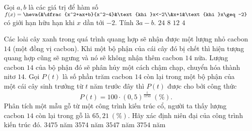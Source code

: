 \begin{ex}%
Gọi $a,b$ là các giá trị để hàm số $f(x)=\heva{&\dfrac{x^2+ax+b}{x^2-4}&\text{khi }x<-2\\&x+1&\text{khi }x\geq -2}$ có giới hạn hữu hạn khi $x$ dần tới $-2$. Tính $3a-b$.
\choice
{$24$}
{$8$}
{\True $12$}
{$4$}
\end{ex}

\begin{ex}%
Các loài cây xanh trong quá trình quang hợp sẽ nhận được một lượng nhỏ cacbon $14$ (một đồng vị cacbon). Khi một bộ phận của cái cây đó bị chết thì hiện tượng quang hợp cũng sẽ ngưng và nó sẽ không nhận thêm cacbon $14$ nữa. Lượng cacbon $14$ của bộ phận đó sẽ phân hủy một cách chậm chạp, chuyển hóa thành nitơ $14$. Gọi $P(t)$ là số phần trăm cacbon $14$ còn lại trong một bộ phận của một cái cây sinh trưởng từ $t$ năm trước đây thì $P(t)$ được cho bởi công thức
$$P(t)=100\cdot (0{,}5)^{\frac{t}{5750}}~(\%).$$
Phân tích một mẫu gỗ từ một công trình kiến trúc cổ, người ta thấy lượng cacbon $14$ còn lại trong gỗ là $65{,}21~(\%)$. Hãy xác định niên đại của công trình kiến trúc đó.
\choice
{$3475$ năm}
{$3574$ năm}
{\True $3547$ năm}
{$3754$ năm}
\end{ex}

